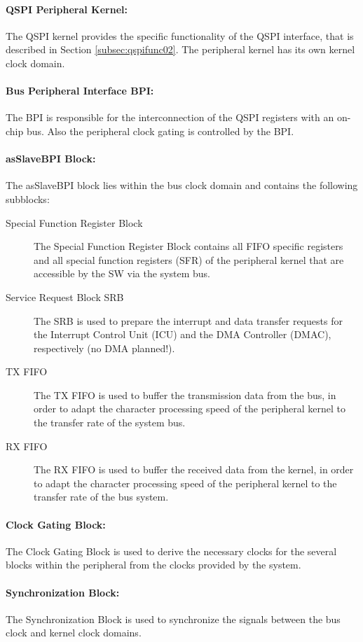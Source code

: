 \paragraph{QSPI Peripheral Kernel: } The QSPI kernel provides the specific functionality of the QSPI interface, that is described in Section \ref{subsec:qspifunc02}. The peripheral kernel has its own kernel clock domain.

\paragraph{Bus Peripheral Interface BPI: } The BPI is responsible for the interconnection of the QSPI registers with an on-chip bus. Also the peripheral clock gating is controlled by the BPI.

\paragraph{asSlaveBPI Block: } The asSlaveBPI block lies within the bus clock domain and contains the following subblocks:
\begin{description}
  \item [Special Function Register Block] The Special Function Register Block contains all FIFO specific registers and all special function registers (SFR) of the peripheral kernel that are accessible by the SW via the system bus.
  \item [Service Request Block SRB] The SRB is used to prepare the interrupt and data transfer requests for the Interrupt Control Unit (ICU) and the DMA Controller (DMAC), respectively (no DMA planned!).
  \item [TX FIFO] The TX FIFO is used to buffer the transmission data from the bus, in order to adapt the character processing speed of the peripheral kernel to the transfer rate of the system bus.
  \item [RX FIFO] The RX FIFO is used to buffer the received data from the kernel, in order to adapt the character processing speed of the peripheral kernel to the transfer rate of the bus system.
\end{description}

\paragraph{Clock Gating Block: } The Clock Gating Block is used to derive the necessary clocks for the several blocks within the peripheral from the clocks provided by the system.

\paragraph{Synchronization Block: } The Synchronization Block is used to synchronize the signals between the bus clock and kernel clock domains.

